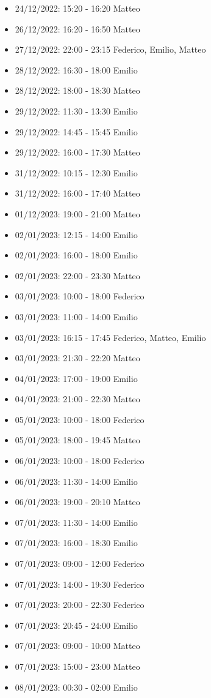 \begin{itemize}
    \item 24/12/2022: 15:20 - 16:20 Matteo
    \item 26/12/2022: 16:20 - 16:50 Matteo
    \item 27/12/2022: 22:00 - 23:15 Federico, Emilio, Matteo
    \item 28/12/2022: 16:30 - 18:00 Emilio
    \item 28/12/2022: 18:00 - 18:30 Matteo
    \item 29/12/2022: 11:30 - 13:30 Emilio
    \item 29/12/2022: 14:45 - 15:45 Emilio
    \item 29/12/2022: 16:00 - 17:30 Matteo
    \item 31/12/2022: 10:15 - 12:30 Emilio
    \item 31/12/2022: 16:00 - 17:40 Matteo
    \item 01/12/2023: 19:00 - 21:00 Matteo
    \item 02/01/2023: 12:15 - 14:00 Emilio
    \item 02/01/2023: 16:00 - 18:00 Emilio
    \item 02/01/2023: 22:00 - 23:30 Matteo
    \item 03/01/2023: 10:00 - 18:00 Federico
    \item 03/01/2023: 11:00 - 14:00 Emilio
    \item 03/01/2023: 16:15 - 17:45 Federico, Matteo, Emilio
    \item 03/01/2023: 21:30 - 22:20 Matteo
    \item 04/01/2023: 17:00 - 19:00 Emilio
    \item 04/01/2023: 21:00 - 22:30 Matteo
    \item 05/01/2023: 10:00 - 18:00 Federico
    \item 05/01/2023: 18:00 - 19:45 Matteo
    \item 06/01/2023: 10:00 - 18:00 Federico
    \item 06/01/2023: 11:30 - 14:00 Emilio
    \item 06/01/2023: 19:00 - 20:10 Matteo
    \item 07/01/2023: 11:30 - 14:00 Emilio
    \item 07/01/2023: 16:00 - 18:30 Emilio
    \item 07/01/2023: 09:00 - 12:00 Federico
    \item 07/01/2023: 14:00 - 19:30 Federico
    \item 07/01/2023: 20:00 - 22:30 Federico
    \item 07/01/2023: 20:45 - 24:00 Emilio
    \item 07/01/2023: 09:00 - 10:00 Matteo
    \item 07/01/2023: 15:00 - 23:00 Matteo
    \item 08/01/2023: 00:30 - 02:00 Emilio
\end{itemize}
\clearpage